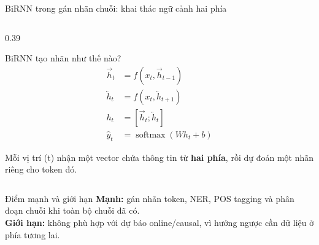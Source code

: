 \documentclass[aspectratio=169, 10pt]{beamer}
\begin{document}
\begin{frame}{BiRNN trong gán nhãn chuỗi: khai thác ngữ cảnh hai phía}
\begin{columns}[T]
\begin{column}{0.39\textwidth}
\begin{exampleblock}{BiRNN tạo nhãn như thế nào?}
\scriptsize
\begin{align*}
\overrightarrow h_t &= f(x_t,\overrightarrow h_{t-1})\\[-2pt]
\overleftarrow h_t &= f(x_t,\overleftarrow h_{t+1})\\[-2pt]
h_t &= [\overrightarrow h_t;\overleftarrow h_t]\\[-2pt]
\widehat y_t &= \operatorname{softmax}(Wh_t+b)
\end{align*}

Mỗi vị trí (t) nhận một vector chứa thông tin từ \textbf{hai phía}, rồi dự đoán một nhãn riêng cho token đó.
\end{exampleblock}
\end{column}
\end{columns}

\vspace{-0.34cm}
\begin{alertblock}{Điểm mạnh và giới hạn}
\scriptsize
\textbf{Mạnh:} gán nhãn token, NER, POS tagging và phân đoạn chuỗi khi toàn bộ chuỗi đã có.\\[-1pt]
\textbf{Giới hạn:} không phù hợp với dự báo online/causal, vì hướng ngược cần dữ liệu ở phía tương lai.
\end{alertblock}
\end{frame}
\end{document}
